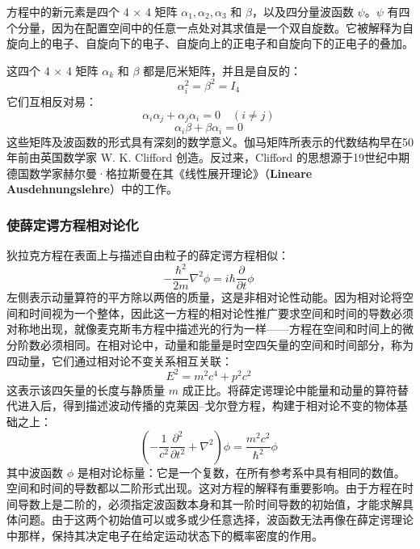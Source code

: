 方程中的新元素是四个 4 × 4 矩阵 \(\alpha_1, \alpha_2, \alpha_3\) 和 \(\beta\)，以及四分量波函数 \(\psi\)。\(\psi\) 有四个分量，因为在配置空间中的任意一点处对其求值是一个双自旋数。它被解释为自旋向上的电子、自旋向下的电子、自旋向上的正电子和自旋向下的正电子的叠加。

这四个 4 × 4 矩阵 \(\alpha_k\) 和 \(\beta\) 都是厄米矩阵，并且是自反的：
\[
\alpha_i^2 = \beta^2 = I_4~
\]
它们互相反对易：
\[
\alpha_i \alpha_j + \alpha_j \alpha_i = 0 \quad (i \neq j)~
\]
\[
\alpha_i \beta + \beta \alpha_i = 0~
\]
这些矩阵及波函数的形式具有深刻的数学意义。伽马矩阵所表示的代数结构早在50年前由英国数学家 W. K. Clifford 创造。反过来，Clifford 的思想源于19世纪中期德国数学家赫尔曼·格拉斯曼在其《线性展开理论》（\textbf{Lineare Ausdehnungslehre}）中的工作。
\subsubsection{使薛定谔方程相对论化}
狄拉克方程在表面上与描述自由粒子的薛定谔方程相似：
\[
- \frac{\hbar^2}{2m} \nabla^2 \phi = i\hbar \frac{\partial}{\partial t} \phi~
\]
左侧表示动量算符的平方除以两倍的质量，这是非相对论性动能。因为相对论将空间和时间视为一个整体，因此这一方程的相对论性推广要求空间和时间的导数必须对称地出现，就像麦克斯韦方程中描述光的行为一样——方程在空间和时间上的微分阶数必须相同。在相对论中，动量和能量是时空四矢量的空间和时间部分，称为四动量，它们通过相对论不变关系相互关联：
\[
E^2 = m^2 c^4 + p^2 c^2~
\]
这表示该四矢量的长度与静质量 \(m\) 成正比。将薛定谔理论中能量和动量的算符替代进入后，得到描述波动传播的克莱因–戈尔登方程，构建于相对论不变的物体基础之上：
\[
\left( -\frac{1}{c^2} \frac{\partial^2}{\partial t^2} + \nabla^2 \right) \phi = \frac{m^2 c^2}{\hbar^2} \phi~
\]
其中波函数 \(\phi\) 是相对论标量：它是一个复数，在所有参考系中具有相同的数值。空间和时间的导数都以二阶形式出现。这对方程的解释有重要影响。由于方程在时间导数上是二阶的，必须指定波函数本身和其一阶时间导数的初始值，才能求解具体问题。由于这两个初始值可以或多或少任意选择，波函数无法再像在薛定谔理论中那样，保持其决定电子在给定运动状态下的概率密度的作用。

